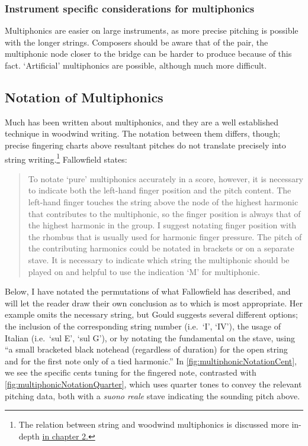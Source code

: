 \subsubsection{Instrument specific considerations for multiphonics}
Multiphonics are easier on large instruments, as more precise pitching is possible with the longer strings.
Composers should be aware that of the pair, the multiphonic node closer to the bridge can be harder to produce because of this fact.
`Artificial' multiphonics are possible, although much more difficult.\autocite[772]{guettlerBowedstringMultiphonicsAnalyzed2012}

\subsection{Notation of Multiphonics}\label{sec:notation-multiphonics}
Much has been written about multiphonics, and they are a well established technique in woodwind writing.
The notation between them differs, though; precise fingering charts above resultant pitches do not translate precisely into string writing.\footnote{The relation between string and woodwind multiphonics is discussed more in-depth \hyperref[sec:multiphonicsWoodwind]{in chapter 2.}}
Fallowfield states: \begin{quotation}
    To notate ‘pure’ multiphonics accurately in a score, however, it is necessary to indicate both the left-hand finger position and the pitch content. 
    The left-hand finger touches the string above the node of the highest harmonic that contributes to the multiphonic, so the finger position is always that of the highest harmonic in the group. 
    I suggest notating finger position with the rhombus that is usually used for harmonic finger pressure. 
    The pitch of the contributing harmonics could be notated in brackets or on a separate stave.
    It is necessary to indicate which string the multiphonic should be played on and helpful to use the indication ‘M’ for multiphonic.\autocite[http://www.cellomap.com/index/the-string/multiphonics-and-other-multiple-sounds.html]{fallowfieldCelloMap}
\end{quotation}
Below, I have notated the permutations of what Fallowfield has described, and will let the reader draw their own conclusion as to which is most appropriate.
Her example omits the necessary string, but Gould suggests several different options; the inclusion of the corresponding string number (i.e.\ `I', `IV'), the usage of Italian (i.e.\ `sul E', `sul G'), or by notating the fundamental on the stave, using ``a small bracketed black notehead (regardless of duration) for the open string and for the first note only of a tied harmonic.''\autocite[418]{gouldBars2011}
In \autoref{fig:multiphonicNotationCent}, we see the specific cents tuning for the fingered note, contrasted with \autoref{fig:multiphonicNotationQuarter}, which uses quarter tones to convey the relevant pitching data, both with a \emph{suono reale} stave indicating the sounding pitch above.

